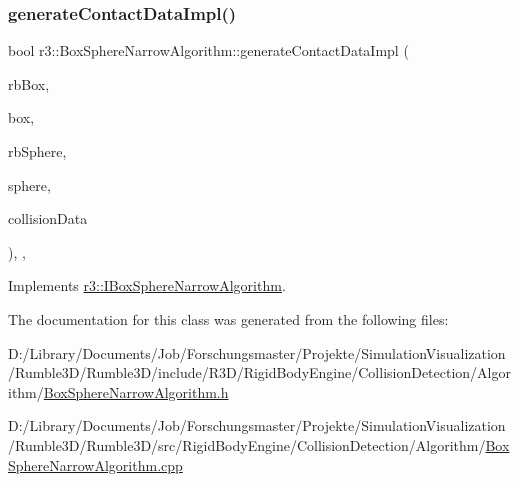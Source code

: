 \subsubsection{\texorpdfstring{generate\+Contact\+Data\+Impl()}{generateContactDataImpl()}}
{\footnotesize\ttfamily bool r3\+::\+Box\+Sphere\+Narrow\+Algorithm\+::generate\+Contact\+Data\+Impl (\begin{DoxyParamCaption}\item[{\mbox{\hyperlink{classr3_1_1_rigid_body}{Rigid\+Body}} $\ast$}]{rb\+Box,  }\item[{\mbox{\hyperlink{classr3_1_1_collision_box}{Collision\+Box}} $\ast$}]{box,  }\item[{\mbox{\hyperlink{classr3_1_1_rigid_body}{Rigid\+Body}} $\ast$}]{rb\+Sphere,  }\item[{\mbox{\hyperlink{classr3_1_1_collision_sphere}{Collision\+Sphere}} $\ast$}]{sphere,  }\item[{\mbox{\hyperlink{classr3_1_1_collision_data}{Collision\+Data}} \&}]{collision\+Data }\end{DoxyParamCaption})\hspace{0.3cm}{\ttfamily [override]}, {\ttfamily [protected]}, {\ttfamily [virtual]}}



Implements \mbox{\hyperlink{classr3_1_1_i_box_sphere_narrow_algorithm_af28bcda3eb527a6ee48a3b624e5d47e0}{r3\+::\+I\+Box\+Sphere\+Narrow\+Algorithm}}.



The documentation for this class was generated from the following files\+:\begin{DoxyCompactItemize}
\item 
D\+:/\+Library/\+Documents/\+Job/\+Forschungsmaster/\+Projekte/\+Simulation\+Visualization/\+Rumble3\+D/\+Rumble3\+D/include/\+R3\+D/\+Rigid\+Body\+Engine/\+Collision\+Detection/\+Algorithm/\mbox{\hyperlink{_box_sphere_narrow_algorithm_8h}{Box\+Sphere\+Narrow\+Algorithm.\+h}}\item 
D\+:/\+Library/\+Documents/\+Job/\+Forschungsmaster/\+Projekte/\+Simulation\+Visualization/\+Rumble3\+D/\+Rumble3\+D/src/\+Rigid\+Body\+Engine/\+Collision\+Detection/\+Algorithm/\mbox{\hyperlink{_box_sphere_narrow_algorithm_8cpp}{Box\+Sphere\+Narrow\+Algorithm.\+cpp}}\end{DoxyCompactItemize}
